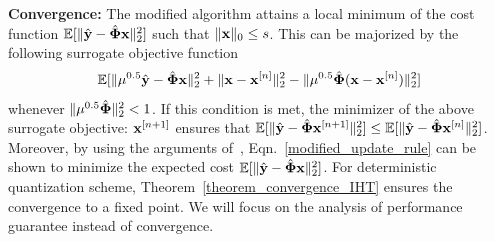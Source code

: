 \documentclass{article}
\begin{document}




{\bf Convergence:} The modified algorithm attains a local minimum of the cost function $\mathbb{E} [ \| \hat{\bf y} - \hat{\bf \Phi}{\bf x}\|_2^2]$ such that $\|{\bf x}\|_0 \leq s$. This can be majorized by the following surrogate objective function 
\begin{equation*}
    \begin{split}
        \mathbb{E} [\|\mu^{0.5}\hat{\bf y} -   \hat{\bf \Phi}{\bf x}\|_2^2+ \|{\bf x} 
    - {\bf x}^{[n]} \|_2^2
    - \|\mu^{0.5}\hat{\bf \Phi}({\bf x}- {\bf x}^{[n]}) \|_2^2] 
    \end{split}
\end{equation*}
whenever $\| \mu^{0.5}\hat{\bf \Phi}\|_2^2 <1$. If this condition is met, the minimizer of the above surrogate objective: ${\bf x}^{[n+1]}$ ensures that $\mathbb{E} [\| \hat{\bf y} - \hat{\bf \Phi}{\bf x}^{[n+1]}\|_2^2] \leq \mathbb{E}[ \| \hat{\bf y} - \hat{\bf \Phi}{\bf x}^{[n]}\|_2^2]$. Moreover, by using the arguments of~\cite{blumensath2008iht}, Eqn.~\ref{modified_update_rule} can be shown to minimize the expected cost $\mathbb{E} [ \| \hat{\bf y} - \hat{\bf \Phi}{\bf x}\|_2^2]$. For deterministic quantization scheme, Theorem~\ref{theorem_convergence_IHT} ensures the convergence to a fixed point. {We
will focus on the analysis of performance guarantee
instead of convergence.}
\end{document}
